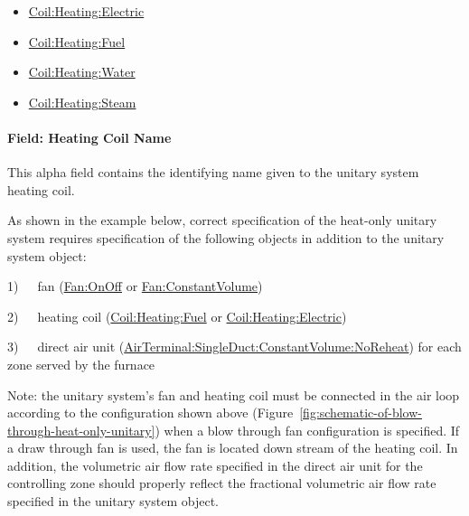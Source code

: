 \begin{itemize}
\item
  \hyperref[coilheatingelectric]{Coil:Heating:Electric}
\item
  \hyperref[coilheatinggas-000]{Coil:Heating:Fuel}
\item
  \hyperref[coilheatingwater]{Coil:Heating:Water}
\item
  \hyperref[coilheatingsteam]{Coil:Heating:Steam}
\end{itemize}

\paragraph{Field: Heating Coil Name}\label{field-heating-coil-name-6}

This alpha field contains the identifying name given to the unitary system heating coil.

As shown in the example below, correct specification of the heat-only unitary system requires specification of the following objects in addition to the unitary system object:

1)~~~fan (\hyperref[fanonoff]{Fan:OnOff} or \hyperref[fanconstantvolume]{Fan:ConstantVolume})

2)~~~heating coil (\hyperref[coilheatinggas-000]{Coil:Heating:Fuel} or \hyperref[coilheatingelectric]{Coil:Heating:Electric})

3)~~~direct air unit (\hyperref[airterminalsingleductconstantvolumenoreheat]{AirTerminal:SingleDuct:ConstantVolume:NoReheat}) for each zone served by the furnace

Note: the unitary system's fan and heating coil must be connected in the air loop according to the configuration shown above (Figure~\ref{fig:schematic-of-blow-through-heat-only-unitary}) when a blow through fan configuration is specified. If a draw through fan is used, the fan is located down stream of the heating coil. In addition, the volumetric air flow rate specified in the direct air unit for the controlling zone should properly reflect the fractional volumetric air flow rate specified in the unitary system object.

